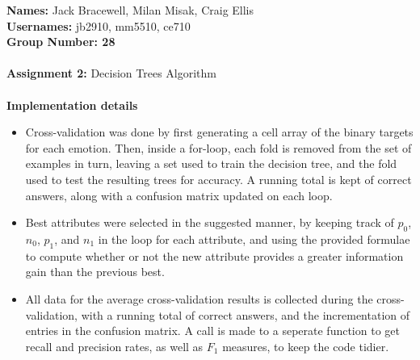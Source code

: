 \documentclass[12pt]{article}
\begin{document}
{\bf Names:} Jack Bracewell, Milan Misak, Craig Ellis \\
{\bf Usernames:} jb2910, mm5510, ce710 \\
{\bf Group Number: 28}  \\ \\

{\bf Assignment 2:} Decision Trees Algorithm \\ \\

{\bf Implementation details} \\
\begin{itemize}
  \item Cross-validation was done by first generating a cell array of the binary targets for each emotion. Then, inside a for-loop, each fold is removed from the set of examples in turn, leaving a set used to train the decision tree, and the fold used to test the resulting trees for accuracy. A running total is kept of correct answers, along with a confusion matrix updated on each loop.
  \item Best attributes were selected in the suggested manner, by keeping track of \( p_0 \), \( n_0 \), \( p_1 \), and \( n_1 \) in the loop for each attribute, and using the provided formulae to compute whether or not the new attribute provides a greater information gain than the previous best.
  \item All data for the average cross-validation results is collected during the cross-validation, with a running total of correct answers, and the incrementation of entries in the confusion matrix. A call is made to a seperate function to get recall and precision rates, as well as \( F_1 \) measures, to keep the code tidier.
\end{itemize}

\newpage
\end{document}
